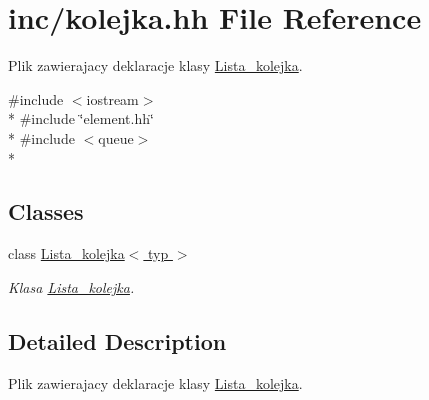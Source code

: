 \hypertarget{kolejka_8hh}{\section{inc/kolejka.hh File Reference}
\label{kolejka_8hh}
}


Plik zawierajacy deklaracje klasy \hyperlink{class_lista__kolejka}{Lista\-\_\-kolejka}.  


{\ttfamily \#include $<$iostream$>$}\\*
{\ttfamily \#include \char`\"{}element.\-hh\char`\"{}}\\*
{\ttfamily \#include $<$queue$>$}\\*
\subsection*{Classes}
\begin{DoxyCompactItemize}
\item 
class \hyperlink{class_lista__kolejka}{Lista\-\_\-kolejka$<$ typ $>$}
\begin{DoxyCompactList}\small\item\em Klasa \hyperlink{class_lista__kolejka}{Lista\-\_\-kolejka}. \end{DoxyCompactList}\end{DoxyCompactItemize}


\subsection{Detailed Description}
Plik zawierajacy deklaracje klasy \hyperlink{class_lista__kolejka}{Lista\-\_\-kolejka}. 